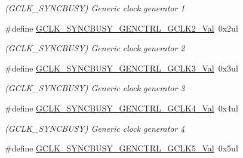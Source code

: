 \begin{DoxyCompactItemize}
\begin{DoxyCompactList}\small\item\em (G\+C\+L\+K\+\_\+\+S\+Y\+N\+C\+B\+U\+S\+Y) Generic clock generator 1 \end{DoxyCompactList}\item 
\hypertarget{group___s_a_m_l21___g_c_l_k_ga54f2ec66d24d75af90f5f69e57eda372}{}\#define \hyperlink{group___s_a_m_l21___g_c_l_k_ga54f2ec66d24d75af90f5f69e57eda372}{G\+C\+L\+K\+\_\+\+S\+Y\+N\+C\+B\+U\+S\+Y\+\_\+\+G\+E\+N\+C\+T\+R\+L\+\_\+\+G\+C\+L\+K2\+\_\+\+Val}~0x2ul\label{group___s_a_m_l21___g_c_l_k_ga54f2ec66d24d75af90f5f69e57eda372}

\begin{DoxyCompactList}\small\item\em (G\+C\+L\+K\+\_\+\+S\+Y\+N\+C\+B\+U\+S\+Y) Generic clock generator 2 \end{DoxyCompactList}\item 
\hypertarget{group___s_a_m_l21___g_c_l_k_gaa08b2a951ab29d44a151e2d11ecfc628}{}\#define \hyperlink{group___s_a_m_l21___g_c_l_k_gaa08b2a951ab29d44a151e2d11ecfc628}{G\+C\+L\+K\+\_\+\+S\+Y\+N\+C\+B\+U\+S\+Y\+\_\+\+G\+E\+N\+C\+T\+R\+L\+\_\+\+G\+C\+L\+K3\+\_\+\+Val}~0x3ul\label{group___s_a_m_l21___g_c_l_k_gaa08b2a951ab29d44a151e2d11ecfc628}

\begin{DoxyCompactList}\small\item\em (G\+C\+L\+K\+\_\+\+S\+Y\+N\+C\+B\+U\+S\+Y) Generic clock generator 3 \end{DoxyCompactList}\item 
\hypertarget{group___s_a_m_l21___g_c_l_k_ga3485377e599f7a35e8fcffe0904bde88}{}\#define \hyperlink{group___s_a_m_l21___g_c_l_k_ga3485377e599f7a35e8fcffe0904bde88}{G\+C\+L\+K\+\_\+\+S\+Y\+N\+C\+B\+U\+S\+Y\+\_\+\+G\+E\+N\+C\+T\+R\+L\+\_\+\+G\+C\+L\+K4\+\_\+\+Val}~0x4ul\label{group___s_a_m_l21___g_c_l_k_ga3485377e599f7a35e8fcffe0904bde88}

\begin{DoxyCompactList}\small\item\em (G\+C\+L\+K\+\_\+\+S\+Y\+N\+C\+B\+U\+S\+Y) Generic clock generator 4 \end{DoxyCompactList}\item 
\hypertarget{group___s_a_m_l21___g_c_l_k_gad0c64bada7d3d22a4fdf4141293014d2}{}\#define \hyperlink{group___s_a_m_l21___g_c_l_k_gad0c64bada7d3d22a4fdf4141293014d2}{G\+C\+L\+K\+\_\+\+S\+Y\+N\+C\+B\+U\+S\+Y\+\_\+\+G\+E\+N\+C\+T\+R\+L\+\_\+\+G\+C\+L\+K5\+\_\+\+Val}~0x5ul\label{group___s_a_m_l21___g_c_l_k_gad0c64bada7d3d22a4fdf4141293014d2}


\end{DoxyCompactItemize}
